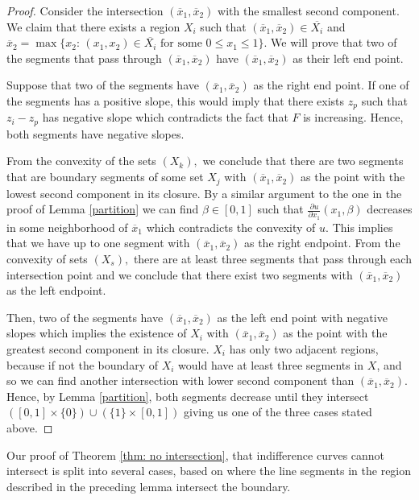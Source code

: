 \documentclass[12pt,reqno]{amsart}
\begin{document}
\begin{proof} Consider the intersection $(\overline{x}_1,\overline{x}_2)$ with the smallest second component. We claim that there exists a region $X_i$ such that  $(\overline{x}_1,\overline{x}_2)\in\overline{X_i}$ and $\overline{x}_2=\max\{x_2:\, (x_1,x_2)\in \overline{X_i} \text{ for some } 0\le x_1\le1\}$.  We will prove that two of the segments that pass through $(\overline{x}_1,\overline{x}_2)$ have $(\overline{x}_1,\overline{x}_2)$ as their left end point. 
    
    
    Suppose that two of the segments have $(\overline{x}_1,\overline{x}_2)$ as the right end point. If one of the segments has a positive slope, this would imply that there exists $z_p$ such that $z_i-z_p$ has negative slope which contradicts the fact that $F$ is increasing. Hence, both segments have negative slopes.
    
    From the convexity of the sets $(X_k),$ we conclude that there are two segments that are boundary segments of some set  $X_j$ with   $(\overline{x}_1,\overline{x}_2)$ as the point with the lowest second component in its closure. By a similar argument to the one in the proof of Lemma \ref{partition} we can find $\beta\in[0,1]$ such that $\frac{\partial u}{\partial x_1}(x_1,\beta)$ decreases in some neighborhood of $\overline{x}_1$ which contradicts the convexity of $u.$ This implies that we have up to one segment with $(\overline{x}_1,\overline{x}_2)$ as the right endpoint. From the convexity of sets $(X_s),$ there are at least three segments that pass through each intersection point and we conclude that there exist two segments with $(\overline{x}_1,\overline{x}_2)$ as the left endpoint.
    
    Then, two of the segments have $(\overline{x}_1,\overline{x}_2)$ as the left end point with negative slopes which implies the existence of $X_i$ with $(\overline{x}_1,\overline{x}_2)$ as the point with the greatest second component in its closure. $X_i$ has only two adjacent regions, because if not the boundary of $X_i$ would have at least three segments in $X$, and so we can find another intersection with lower second component than $(\overline{x}_1,\overline{x}_2).$ Hence, by Lemma \ref{partition}, both segments decrease until they intersect $([0,1]\times\{0\}) \cup(\{1\}\times[0,1])$ giving us one of the three cases stated above.
    \end{proof}
Our proof of Theorem \ref{thm: no intersection}, that indifference curves cannot intersect is split into several cases, based on where the line segments in the region described in the preceding lemma intersect the boundary.
\end{document}
